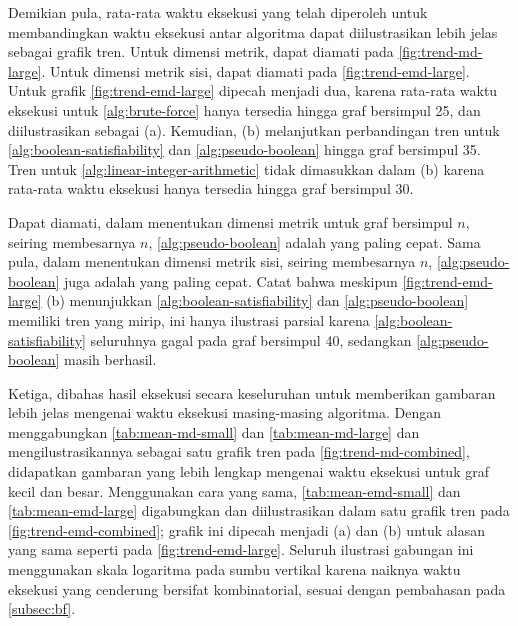 \documentclass[10pt,twocolumn]{article}
\newcommand{\minipagewidth}{\linewidth}
\begin{document}
\begin{center}
	\renewcommand{\minipagewidth}{\linewidth}

	

	\vspace{1em}

	
\end{center}

Demikian pula, rata-rata waktu eksekusi yang telah diperoleh untuk membandingkan waktu eksekusi antar algoritma dapat diilustrasikan lebih jelas sebagai grafik tren. Untuk dimensi metrik, dapat diamati pada \autoref{fig:trend-md-large}. Untuk dimensi metrik sisi, dapat diamati pada \autoref{fig:trend-emd-large}. Untuk grafik \autoref{fig:trend-emd-large} dipecah menjadi dua, karena rata-rata waktu eksekusi untuk \autoref{alg:brute-force} hanya tersedia hingga graf bersimpul 25, dan diilustrasikan sebagai (a). Kemudian, (b) melanjutkan perbandingan tren untuk \autoref{alg:boolean-satisfiability} dan \autoref{alg:pseudo-boolean} hingga graf bersimpul 35. Tren untuk \autoref{alg:linear-integer-arithmetic} tidak dimasukkan dalam (b) karena rata-rata waktu eksekusi hanya tersedia hingga graf bersimpul 30.

Dapat diamati, dalam menentukan dimensi metrik untuk graf bersimpul \(n\), seiring membesarnya \(n\), \autoref{alg:pseudo-boolean} adalah yang paling cepat. Sama pula, dalam menentukan dimensi metrik sisi, seiring membesarnya \(n\), \autoref{alg:pseudo-boolean} juga adalah yang paling cepat. Catat bahwa meskipun \autoref{fig:trend-emd-large} (b) menunjukkan \autoref{alg:boolean-satisfiability} dan \autoref{alg:pseudo-boolean} memiliki tren yang mirip, ini hanya ilustrasi parsial karena \autoref{alg:boolean-satisfiability} seluruhnya gagal pada graf bersimpul 40, sedangkan \autoref{alg:pseudo-boolean} masih berhasil.

\begin{center}
	\renewcommand{\minipagewidth}{0.9\linewidth}

	

	\vspace{1em}

	

\end{center}

Ketiga, dibahas hasil eksekusi secara keseluruhan untuk memberikan gambaran lebih jelas mengenai waktu eksekusi masing-masing algoritma. Dengan menggabungkan \autoref{tab:mean-md-small} dan \autoref{tab:mean-md-large} dan mengilustrasikannya sebagai satu grafik tren pada \autoref{fig:trend-md-combined}, didapatkan gambaran yang lebih lengkap mengenai waktu eksekusi untuk graf kecil dan besar. Menggunakan cara yang sama, \autoref{tab:mean-emd-small} dan \autoref{tab:mean-emd-large} digabungkan dan diilustrasikan dalam satu grafik tren pada \autoref{fig:trend-emd-combined}; grafik ini dipecah menjadi (a) dan (b) untuk alasan yang sama seperti pada \autoref{fig:trend-emd-large}. Seluruh ilustrasi gabungan ini menggunakan skala logaritma pada sumbu vertikal karena naiknya waktu eksekusi yang cenderung bersifat kombinatorial, sesuai dengan pembahasan pada \autoref{subsec:bf}.
\end{document}
